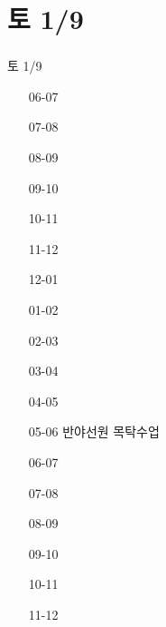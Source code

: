 \documentclass[aspectratio=1610,20pt,xcolor=pdftex,dvipsnames,table,handout]{beamer}
\begin{document}
	\section{토 1/9}											
	\begin{frame} [t,plain]											
	\frametitle{}											
		\begin{block} {토 1/9}										
		\setlength{\leftmargini}{3em}										
		\begin{itemize}										
			\item [06-07] \hrulefill									
			\item [07-08] \hrulefill									
			\item [08-09] \hrulefill									
			\item [09-10] \hrulefill									
			\item [10-11] \hrulefill									
			\item [11-12] \hrulefill									
			\item [12-01] \hrulefill									
			\item [01-02] \hrulefill									
			\item [02-03] \hrulefill									
			\item [03-04] \hrulefill									
			\item [04-05] \hrulefill									
			\item [05-06] \hrulefill			반야선원 목탁수업						
			\item [06-07] \hrulefill									
			\item [07-08] \hrulefill									
			\item [08-09] \hrulefill									
			\item [09-10] \hrulefill									
			\item [10-11] \hrulefill									
			\item [11-12] \hrulefill									
		\end{itemize}										
		\end{block}										
	\end{frame}											
												
\end{document}
